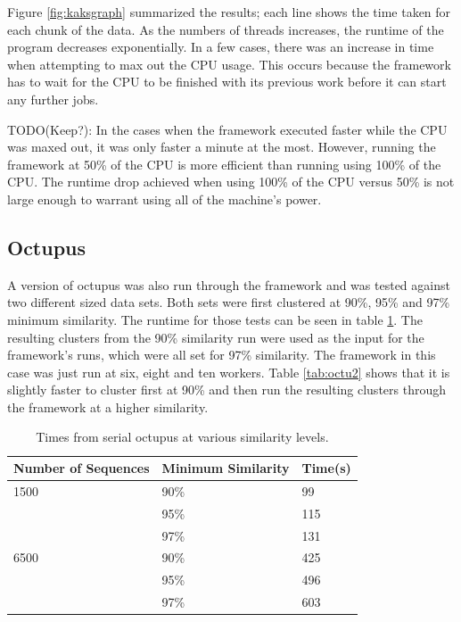 \documentclass[12pt]{article}
\begin{document}
Figure \ref{fig:kaksgraph} summarized the results; each line shows the time
taken for each chunk of the data. As the numbers of threads increases, the
runtime of the program decreases exponentially. In a few cases, there was an
increase in time when attempting to max out the CPU usage. This occurs because
the framework has to wait for the CPU to be finished with its previous work
before it can start any further jobs. 

TODO(Keep?): In the cases when the framework executed faster while the CPU was 
maxed out, it was only faster a minute at the most. However, running the 
framework at 50\% of the CPU is more efficient than running using 100\% of the 
CPU. The runtime drop achieved when using 100\% of the CPU versus 50\% is not 
large enough to warrant using all of the machine's power.

\subsection{Octupus}

A version of octupus was also run through the framework and was tested against
two different sized data sets. Both sets were first clustered at 90\%, 95\% and
97\% minimum similarity. The runtime for those tests can be seen in table
\ref{tab:octu1}. The resulting clusters from the 90\% similarity run were used as
the input for the framework's runs, which were all set for 97\% similarity. 
The framework in this case was just run at six, eight and ten workers. Table 
\ref{tab:octu2} shows that it is slightly faster to cluster first at 90\% and 
then run the resulting clusters through the framework at a higher similarity. 

\begin{table}
    \begin{center}
    \begin{tabular}{|l|l|l|}
    \hline
        Number of Sequences & Minimum Similarity & Time(s) \\ \hline
        1500                & 90\%               & 99      \\
        ~                   & 95\%               & 115     \\
        ~                   & 97\%               & 131     \\ \hline
        6500                & 90\%               & 425     \\
        ~                   & 95\%               & 496     \\
        ~                   & 97\%               & 603     \\ \hline
    \end{tabular}
    \caption{Times from serial octupus at various similarity levels.}
    \end{center}
    \label{tab:octu1}
\end{table}
\end{document}
